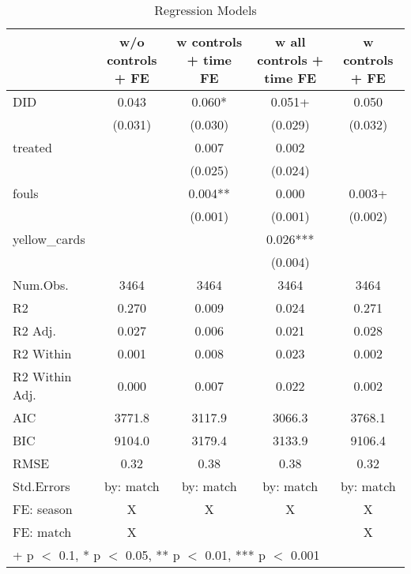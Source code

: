 \begin{table}

\caption{Regression Models}
\centering
\begin{tabular}[t]{lcccc}
\toprule
  & w/o controls + FE & w controls + time FE & w all controls + time FE & w controls + FE\\
\midrule
DID & \num{0.043} & \num{0.060}* & \num{0.051}+ & \num{0.050}\\
 & (\num{0.031}) & (\num{0.030}) & (\num{0.029}) & (\num{0.032})\\
treated &  & \num{0.007} & \num{0.002} & \\
 &  & (\num{0.025}) & (\num{0.024}) & \\
fouls &  & \num{0.004}** & \num{0.000} & \num{0.003}+\\
 &  & (\num{0.001}) & (\num{0.001}) & (\num{0.002})\\
yellow\_cards &  &  & \num{0.026}*** & \\
 &  &  & (\num{0.004}) & \\
\midrule
Num.Obs. & \num{3464} & \num{3464} & \num{3464} & \num{3464}\\
R2 & \num{0.270} & \num{0.009} & \num{0.024} & \num{0.271}\\
R2 Adj. & \num{0.027} & \num{0.006} & \num{0.021} & \num{0.028}\\
R2 Within & \num{0.001} & \num{0.008} & \num{0.023} & \num{0.002}\\
R2 Within Adj. & \num{0.000} & \num{0.007} & \num{0.022} & \num{0.002}\\
AIC & \num{3771.8} & \num{3117.9} & \num{3066.3} & \num{3768.1}\\
BIC & \num{9104.0} & \num{3179.4} & \num{3133.9} & \num{9106.4}\\
RMSE & \num{0.32} & \num{0.38} & \num{0.38} & \num{0.32}\\
Std.Errors & by: match & by: match & by: match & by: match\\
FE: season & X & X & X & X\\
FE: match & X &  &  & X\\
\bottomrule
\multicolumn{5}{l}{\rule{0pt}{1em}+ p $<$ 0.1, * p $<$ 0.05, ** p $<$ 0.01, *** p $<$ 0.001}\\
\end{tabular}
\end{table}
